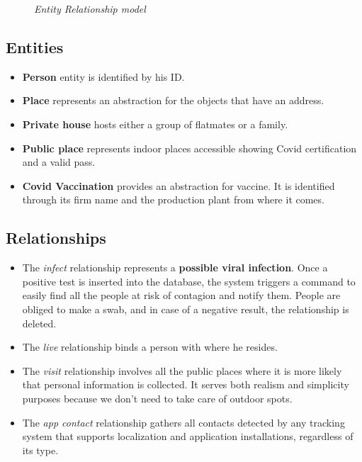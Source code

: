 \begin{figure}[h]
    \noindent{}
\caption{\textit{Entity Relationship model}}
\end{figure}

\subsection{Entities}
\begin{itemize}
    \item \textbf{Person} entity is identified by his ID. 
    \item \textbf{Place} represents an abstraction for the objects that have an address.
    \item \textbf{Private house} hosts either a group of flatmates or a family.
    \item \textbf{Public place} represents indoor places accessible showing Covid certification and a valid pass.
    \item \textbf{Covid Vaccination} provides an abstraction for vaccine. It is identified through its firm name and the production plant from where it comes.
\end{itemize}

\newpage
\subsection{Relationships}
\begin{itemize}
    \item The \textit{infect} relationship represents a \textbf{possible viral infection}. Once a positive test is inserted into the database, the system triggers a command to easily find all the people at risk of contagion and notify them. People are obliged to make a swab, and in case of a negative result, the relationship is deleted.
    \item The \textit{live} relationship binds a person with where he resides.
    \item The \textit{visit} relationship involves all the public places where it is more likely that personal information is collected. It serves both realism and simplicity purposes because we don't need to take care of outdoor spots.
    \item The \textit{app contact} relationship gathers all contacts detected by any tracking system that supports localization and application installations, regardless of its type.
\end{itemize}